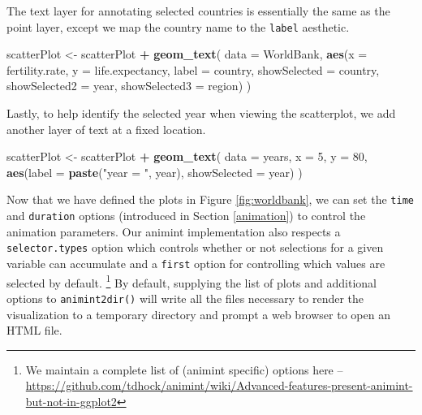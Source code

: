 \documentclass[12pt,]{article}
\newenvironment{Shaded}{\begin{snugshade}}{\end{snugshade}}
\newcommand{\KeywordTok}[1]{\textcolor[rgb]{0.13,0.29,0.53}{\textbf{#1}}}
\newcommand{\DataTypeTok}[1]{\textcolor[rgb]{0.13,0.29,0.53}{#1}}
\newcommand{\DecValTok}[1]{\textcolor[rgb]{0.00,0.00,0.81}{#1}}
\newcommand{\StringTok}[1]{\textcolor[rgb]{0.31,0.60,0.02}{#1}}
\newcommand{\OperatorTok}[1]{\textcolor[rgb]{0.81,0.36,0.00}{\textbf{#1}}}
\newcommand{\NormalTok}[1]{#1}
\let\rmarkdownfootnote\footnote%
\def\footnote{\protect\rmarkdownfootnote}
\theoremstyle{definition}
\theoremstyle{definition}
\theoremstyle{remark}
\begin{document}
The text layer for annotating selected countries is essentially the same
as the point layer, except we map the country name to the \texttt{label}
aesthetic.

\begin{Shaded}
\begin{Highlighting}[]
\NormalTok{scatterPlot <-}\StringTok{ }\NormalTok{scatterPlot }\OperatorTok{+}\StringTok{ }\KeywordTok{geom_text}\NormalTok{(}
  \DataTypeTok{data =}\NormalTok{ WorldBank,}
  \KeywordTok{aes}\NormalTok{(}\DataTypeTok{x =}\NormalTok{ fertility.rate, }\DataTypeTok{y =}\NormalTok{ life.expectancy,}
      \DataTypeTok{label =}\NormalTok{ country,}
      \DataTypeTok{showSelected =}\NormalTok{ country,}
      \DataTypeTok{showSelected2 =}\NormalTok{ year,}
      \DataTypeTok{showSelected3 =}\NormalTok{ region)}
\NormalTok{)}
\end{Highlighting}
\end{Shaded}

Lastly, to help identify the selected year when viewing the scatterplot,
we add another layer of text at a fixed location.

\begin{Shaded}
\begin{Highlighting}[]
\NormalTok{scatterPlot <-}\StringTok{ }\NormalTok{scatterPlot }\OperatorTok{+}\StringTok{ }\KeywordTok{geom_text}\NormalTok{(}
  \DataTypeTok{data =}\NormalTok{ years, }\DataTypeTok{x =} \DecValTok{5}\NormalTok{, }\DataTypeTok{y =} \DecValTok{80}\NormalTok{,}
  \KeywordTok{aes}\NormalTok{(}\DataTypeTok{label =} \KeywordTok{paste}\NormalTok{(}\StringTok{"year = "}\NormalTok{, year),}
      \DataTypeTok{showSelected =}\NormalTok{ year)}
\NormalTok{)}
\end{Highlighting}
\end{Shaded}

Now that we have defined the plots in Figure \ref{fig:worldbank}, we can
set the \texttt{time} and \texttt{duration} options (introduced in
Section \ref{animation}) to control the animation parameters. Our
animint implementation also respects a \texttt{selector.types} option
which controls whether or not selections for a given variable can
accumulate and a \texttt{first} option for controlling which values are
selected by default.
\footnote{We maintain a complete list of (animint specific) options here -- \url{https://github.com/tdhock/animint/wiki/Advanced-features-present-animint-but-not-in-ggplot2}}
By default, supplying the list of plots and additional options to
\texttt{animint2dir()} will write all the files necessary to render the
visualization to a temporary directory and prompt a web browser to open
an HTML file.
\end{document}
